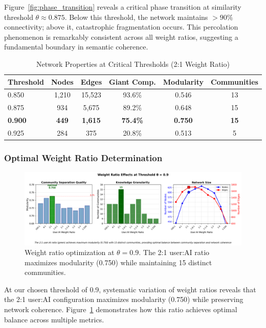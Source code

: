 \documentclass{svproc}
\begin{document}
Figure~\ref{fig:phase_transition} reveals a critical phase transition at similarity threshold $\theta \approx 0.875$. Below this threshold, the network maintains $>90\%$ connectivity; above it, catastrophic fragmentation occurs. This percolation phenomenon is remarkably consistent across all weight ratios, suggesting a fundamental boundary in semantic coherence.

\begin{table}[h]
\centering
\caption{Network Properties at Critical Thresholds (2:1 Weight Ratio)}
\label{tab:threshold_critical}
\begin{tabular}{lccccc}
\toprule
\textbf{Threshold} & \textbf{Nodes} & \textbf{Edges} & \textbf{Giant Comp.} & \textbf{Modularity} & \textbf{Communities} \\
\midrule
0.850 & 1,210 & 15,523 & 93.6\% & 0.546 & 13 \\
0.875 & 934 & 5,675 & 89.2\% & 0.648 & 15 \\
\textbf{0.900} & \textbf{449} & \textbf{1,615} & \textbf{75.4\%} & \textbf{0.750} & \textbf{15} \\
0.925 & 284 & 375 & 20.8\% & 0.513 & 5 \\
\bottomrule
\end{tabular}
\end{table}


\subsubsection{Optimal Weight Ratio Determination}

\begin{figure}[h]
\centering
\includegraphics[width=\textwidth]{./images/weight_ratio_analysis_clean.png}
\caption{Weight ratio optimization at $\theta = 0.9$. The 2:1 user:AI ratio maximizes modularity (0.750) while maintaining 15 distinct communities.}
\label{fig:weight_ratio_analysis}
\end{figure}

At our chosen threshold of 0.9, systematic variation of weight ratios reveals that the 2:1 user:AI configuration maximizes modularity (0.750) while preserving network coherence. Figure~\ref{fig:weight_ratio_analysis} demonstrates how this ratio achieves optimal balance across multiple metrics.
\end{document}
